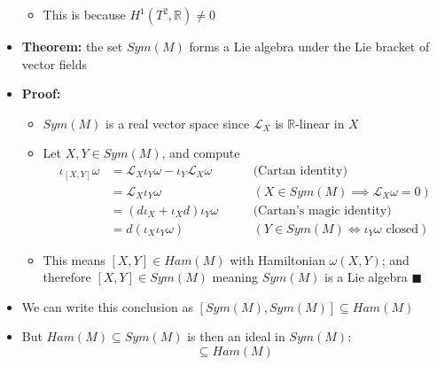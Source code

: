 \documentclass[12pt,a4paper]{article}
\numberwithin{equation}{section}
\begin{document}
\begin{itemize}
\begin{itemize}
			\item This is because $H^{1}(T^{2},\mathbb{R})\neq 0$
		\end{itemize}
		\item \textbf{Theorem:} the set $Sym(M)$ forms a Lie algebra under the Lie bracket of vector fields
		\item \textbf{Proof:}
		\begin{itemize}
			\item $Sym(M)$ is a real vector space since $\mathcal{L}_{X}$ is $\mathbb{R}$-linear in $X$
			\item Let $X,Y\in Sym(M)$, and compute
			\begin{equation}
				\begin{aligned}
					\iota_{[X,Y]}\omega&=\mathcal{L}_{X}\iota_{Y}\omega-\iota_{Y}\mathcal{L}_{X}\omega\qquad&\text{(Cartan identity)}\\
					&=\mathcal{L}_{X}\iota_{Y}\omega\qquad&(X\in Sym(M)\implies\mathcal{L}_{X}\omega=0)\\
					&=(d\iota_{X}+\iota_{X}d)\iota_{Y}\omega\qquad&\text{(Cartan's magic identity)}\\
					&=d(\iota_{X}\iota_{Y}\omega)\qquad&(Y\in Sym(M)\iff \iota_{Y}\omega\text{ closed})
				\end{aligned}
			\end{equation}
			\item This means $[X,Y]\in Ham(M)$ with Hamiltonian $\omega(X,Y)$; and therefore $[X,Y]\in Sym(M)$ meaning $Sym(M)$ is a Lie algebra $\blacksquare$
		\end{itemize}
		\item We can write this conclusion as $[Sym(M),Sym(M)]\subseteq Ham(M)$
		\item But $Ham(M)\subseteq Sym(M)$ is then an ideal in $Sym(M)$:
		\begin{equation}
			[Sym(M),Ham(M)]\subseteq Ham(M)
		\end{equation}
	\end{itemize}
\end{document}
